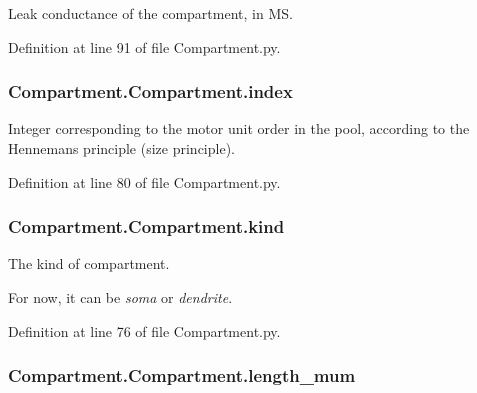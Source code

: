 Leak conductance of the compartment, in MS. 



Definition at line 91 of file Compartment.\+py.

\subsubsection[{\texorpdfstring{index}{index}}]{\setlength{\rightskip}{0pt plus 5cm}Compartment.\+Compartment.\+index}\hypertarget{class_compartment_1_1_compartment_a9402ef46ede52521ebbb9e9d2d68d631}{}\label{class_compartment_1_1_compartment_a9402ef46ede52521ebbb9e9d2d68d631}


Integer corresponding to the motor unit order in the pool, according to the Henneman\textquotesingle{}s principle (size principle). 



Definition at line 80 of file Compartment.\+py.

\subsubsection[{\texorpdfstring{kind}{kind}}]{\setlength{\rightskip}{0pt plus 5cm}Compartment.\+Compartment.\+kind}\hypertarget{class_compartment_1_1_compartment_a74f2266a2231c4a81cc680bc201f0ffd}{}\label{class_compartment_1_1_compartment_a74f2266a2231c4a81cc680bc201f0ffd}


The kind of compartment. 

For now, it can be {\itshape soma} or {\itshape dendrite}. 

Definition at line 76 of file Compartment.\+py.

\subsubsection[{\texorpdfstring{length\+\_\+mum}{length_mum}}]{\setlength{\rightskip}{0pt plus 5cm}Compartment.\+Compartment.\+length\+\_\+mum}\hypertarget{class_compartment_1_1_compartment_a8154742b0082eea301690e3566e477b6}{}\label{class_compartment_1_1_compartment_a8154742b0082eea301690e3566e477b6}


